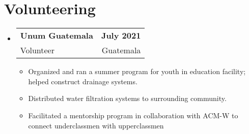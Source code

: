 \documentclass[11pt, letterpaper]{article}
\makeatletter
\newcommand{\resumeItem}[1]{
  \item\small{
    {#1 \vspace{-2pt}}
  }
}
\newcommand{\resumeSubheading}[4]{
  \vspace{-2pt}\item
    \begin{tabular*}{1.0\textwidth}[t]{l@{\extracolsep{\fill}}r}
      \textbf{#1} & \textbf{\small #2} \\
      {\small#3} & {\small #4} \\
    \end{tabular*}\vspace{-7pt}
}
\newcommand{\resumeSubHeadingListStart}{\begin{itemize}[leftmargin=0.0in, label={}]}
\newcommand{\resumeSubHeadingListEnd}{\end{itemize}}
\newcommand{\resumeItemListStart}{\begin{itemize}}
\newcommand{\resumeItemListEnd}{\end{itemize}\vspace{-5pt}}
\makeatother
\begin{document}
\section{Volunteering}
  \resumeSubHeadingListStart
  
    \resumeSubheading
      {Unum Guatemala}{July 2021}
      {Volunteer}{Guatemala}
      \resumeItemListStart
        \resumeItem{Organized and ran a summer program for youth in education facility; helped construct drainage systems.}
        \resumeItem{Distributed water filtration systems to surrounding community.}
        \resumeItem{Facilitated a mentorship program in collaboration with ACM-W to connect underclassmen with upperclassmen}
      \resumeItemListEnd
      
  \resumeSubHeadingListEnd

  
      

\end{document}
